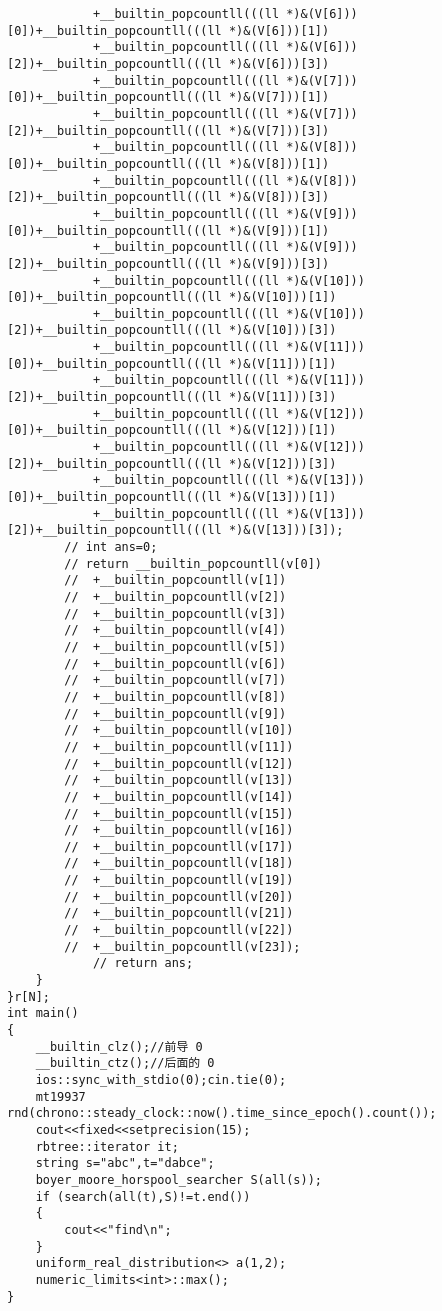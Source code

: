 \documentclass[12pt]{ctexart}
\begin{document}
\begin{lstlisting}
			+__builtin_popcountll(((ll *)&(V[6]))[0])+__builtin_popcountll(((ll *)&(V[6]))[1])
			+__builtin_popcountll(((ll *)&(V[6]))[2])+__builtin_popcountll(((ll *)&(V[6]))[3])
			+__builtin_popcountll(((ll *)&(V[7]))[0])+__builtin_popcountll(((ll *)&(V[7]))[1])
			+__builtin_popcountll(((ll *)&(V[7]))[2])+__builtin_popcountll(((ll *)&(V[7]))[3])
			+__builtin_popcountll(((ll *)&(V[8]))[0])+__builtin_popcountll(((ll *)&(V[8]))[1])
			+__builtin_popcountll(((ll *)&(V[8]))[2])+__builtin_popcountll(((ll *)&(V[8]))[3])
			+__builtin_popcountll(((ll *)&(V[9]))[0])+__builtin_popcountll(((ll *)&(V[9]))[1])
			+__builtin_popcountll(((ll *)&(V[9]))[2])+__builtin_popcountll(((ll *)&(V[9]))[3])
			+__builtin_popcountll(((ll *)&(V[10]))[0])+__builtin_popcountll(((ll *)&(V[10]))[1])
			+__builtin_popcountll(((ll *)&(V[10]))[2])+__builtin_popcountll(((ll *)&(V[10]))[3])
			+__builtin_popcountll(((ll *)&(V[11]))[0])+__builtin_popcountll(((ll *)&(V[11]))[1])
			+__builtin_popcountll(((ll *)&(V[11]))[2])+__builtin_popcountll(((ll *)&(V[11]))[3])
			+__builtin_popcountll(((ll *)&(V[12]))[0])+__builtin_popcountll(((ll *)&(V[12]))[1])
			+__builtin_popcountll(((ll *)&(V[12]))[2])+__builtin_popcountll(((ll *)&(V[12]))[3])
			+__builtin_popcountll(((ll *)&(V[13]))[0])+__builtin_popcountll(((ll *)&(V[13]))[1])
			+__builtin_popcountll(((ll *)&(V[13]))[2])+__builtin_popcountll(((ll *)&(V[13]))[3]);
		// int ans=0;
		// return __builtin_popcountll(v[0])
		// 	+__builtin_popcountll(v[1])
		// 	+__builtin_popcountll(v[2])
		// 	+__builtin_popcountll(v[3])
		// 	+__builtin_popcountll(v[4])
		// 	+__builtin_popcountll(v[5])
		// 	+__builtin_popcountll(v[6])
		// 	+__builtin_popcountll(v[7])
		// 	+__builtin_popcountll(v[8])
		// 	+__builtin_popcountll(v[9])
		// 	+__builtin_popcountll(v[10])
		// 	+__builtin_popcountll(v[11])
		// 	+__builtin_popcountll(v[12])
		// 	+__builtin_popcountll(v[13])
		// 	+__builtin_popcountll(v[14])
		// 	+__builtin_popcountll(v[15])
		// 	+__builtin_popcountll(v[16])
		// 	+__builtin_popcountll(v[17])
		// 	+__builtin_popcountll(v[18])
		// 	+__builtin_popcountll(v[19])
		// 	+__builtin_popcountll(v[20])
		// 	+__builtin_popcountll(v[21])
		// 	+__builtin_popcountll(v[22])
		// 	+__builtin_popcountll(v[23]);
			// return ans;
	}
}r[N];
int main()
{
    __builtin_clz();//前导 0
    __builtin_ctz();//后面的 0
	ios::sync_with_stdio(0);cin.tie(0);
	mt19937 rnd(chrono::steady_clock::now().time_since_epoch().count());
    cout<<fixed<<setprecision(15);
	rbtree::iterator it;
	string s="abc",t="dabce";
	boyer_moore_horspool_searcher S(all(s));
	if (search(all(t),S)!=t.end())
	{
		cout<<"find\n";
	}
    uniform_real_distribution<> a(1,2);
	numeric_limits<int>::max();
}
\end{lstlisting}
\end{document}
